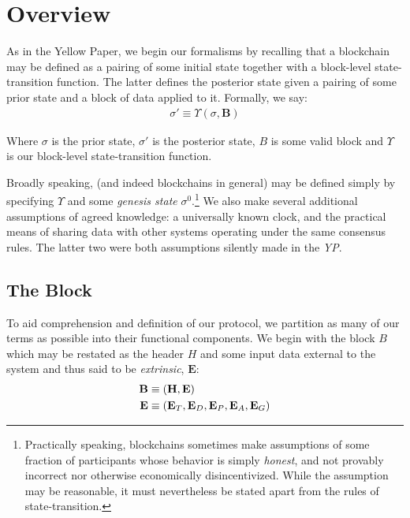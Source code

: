\section{Overview}\label{sec:overview}

As in the Yellow Paper, we begin our formalisms by recalling that a blockchain may be defined as a pairing of some initial state together with a block-level state-transition function. The latter defines the posterior state given a pairing of some prior state and a block of data applied to it. Formally, we say:
\begin{align}\label{eq:statetransition}
\sigma' \equiv \Upsilon(\sigma, \mathbf{B})
\end{align}

Where $\sigma$ is the prior state, $\sigma'$ is the posterior state, $B$ is some valid block and $\Upsilon$ is our block-level state-transition function.

Broadly speaking, \Jam (and indeed blockchains in general) may be defined simply by specifying $\Upsilon$ and some \emph{genesis state} $\sigma^0$.\footnote{Practically speaking, blockchains sometimes make assumptions of some fraction of participants whose behavior is simply \emph{honest}, and not provably incorrect nor otherwise economically disincentivized. While the assumption may be reasonable, it must nevertheless be stated apart from the rules of state-transition.} We also make several additional assumptions of agreed knowledge: a universally known clock, and the practical means of sharing data with other systems operating under the same consensus rules. The latter two were both assumptions silently made in the \emph{YP}.

\subsection{The Block}

To aid comprehension and definition of our protocol, we partition as many of our terms as possible into their functional components. We begin with the block $B$ which may be restated as the header $H$ and some input data external to the system and thus said to be \emph{extrinsic}, $\mathbf{E}$:
\begin{align}
  \label{eq:block}\mathbf{B} &\equiv (\mathbf{H}, \mathbf{E}) \\
  \label{eq:extrinsic}\mathbf{E} &\equiv (\mathbf{E}_T, \mathbf{E}_D, \mathbf{E}_P, \mathbf{E}_A, \mathbf{E}_G)
\end{align}

